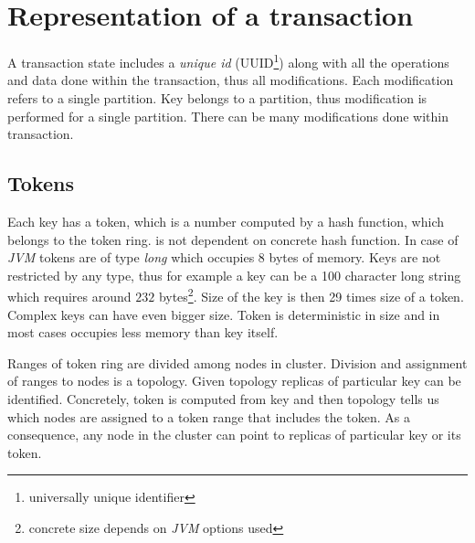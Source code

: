 
\section{Representation of a transaction}
A transaction state includes a \emph{unique id} (UUID\footnote{universally unique identifier}) along with all the operations and data done within the transaction, thus all modifications. 
Each modification refers to a single partition. Key belongs to a partition, thus modification is performed for a single partition. There can be many modifications done within transaction. 

\subsection{Tokens}

Each key has a token, which is a number computed by a hash function, which belongs to the token ring. \mpp is not dependent on concrete hash function. In case of \emph{JVM} tokens are of type \emph{long} which occupies 8 bytes of memory. Keys are not restricted by any type, thus for example a key can be a 100 character long string which requires around $232$ bytes\footnote{concrete size depends on \emph{JVM} options used}. Size of the key is then 29 times size of a token. Complex keys can have even bigger size. Token is deterministic in size and in most cases occupies less memory than key itself.

Ranges of token ring are divided among nodes in cluster. Division and assignment of ranges to nodes is a topology. Given topology replicas of particular key can be identified. Concretely, token is computed from key and then topology tells us which nodes are assigned to a token range that includes the token. As a consequence, any node in the cluster can point to replicas of particular key or its token.


